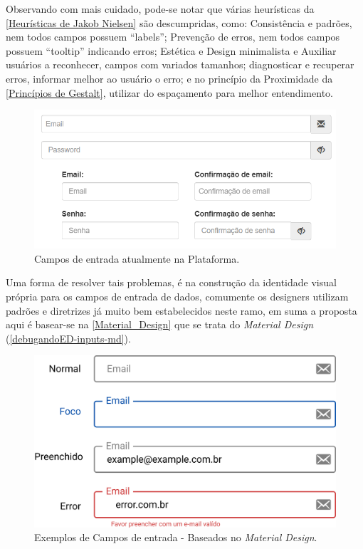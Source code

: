 Observando com mais cuidado, pode-se notar que várias heurísticas da \autoref{Heurísticas de Jakob Nielsen} são descumpridas, como: Consistência e padrões, nem todos campos possuem “labels”; Prevenção de erros, nem todos campos possuem “tooltip” indicando erros; Estética e Design minimalista e Auxiliar usuários a reconhecer, campos com variados tamanhos; diagnosticar e recuperar erros, informar melhor ao usuário o erro; e no princípio da Proximidade da \autoref{Princípios de Gestalt}, utilizar do espaçamento para melhor entendimento.

\begin{figure}[ht]
    \begin{center}
	    \includegraphics[scale=0.55]{figs/debugandoED-inputs.png}
	\end{center}
    \caption{\label{debugandoED-inputs}Campos de entrada atualmente na Plataforma.}
\end{figure}


Uma forma de resolver tais problemas, é na construção da identidade visual própria para os campos de entrada de dados, comumente os designers utilizam padrões e diretrizes já muito bem estabelecidos neste ramo, em suma a proposta aqui é basear-se na \autoref{Material_Design} que se trata do \textit{Material Design} (\autoref{debugandoED-inputs-md}).

\begin{figure}[ht]
    \begin{center}
	    \includegraphics[scale=0.52]{figs/debugandoED-inputs-md.png}
	\end{center}
    \caption{\label{debugandoED-inputs-md}Exemplos de Campos de entrada - Baseados no \textit{Material Design}.}
\end{figure}

